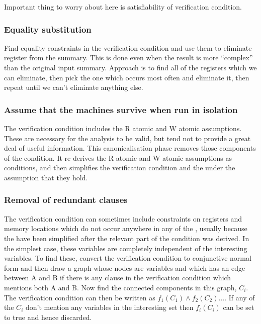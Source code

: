 \documentclass[12pt,a4paper]{book}
\begin{document}
Important thing to worry about here is satisfiability of verification condition.

\subsubsection{Equality substitution}
Find equality constraints in the verification condition and use them to eliminate register from the summary.
This is done even when the result is more ``complex'' than the original input summary.
Approach is to find all of the registers which we can eliminate, then pick the one which occurs most often and eliminate it, then repeat until we can't eliminate anything else.


\subsubsection{Assume that the machines survive when run in isolation}
The verification condition includes the R atomic and W atomic assumptions.
These are necessary for the analysis to be valid, but tend not to provide a great deal of useful information.
This canonicalisation phase removes those components of the condition.
It re-derives the R atomic and W atomic assumptions as conditions, and then simplifies the verification condition and the \StateMachines under the assumption that they hold.

\subsubsection{Removal of redundant clauses}
The verification condition can sometimes include constraints on registers and memory locations which do not occur anywhere in any of the \StateMachines, usually because the \StateMachines have been simplified after the relevant part of the condition was derived.
In the simplest case, these variables are completely independent of the interesting variables.
To find these, convert the verification condition to conjunctive normal form and then draw a graph whose nodes are variables and which has an edge between A and B if there is any clause in the verification condition which mentions both A and B.
Now find the connected components in this graph, $C_i$.
The verification condition can then be written as $f_1(C_1) \wedge f_2(C_2) \ldots$.
If any of the $C_i$ don't mention any variables in the interesting set then $f_i(C_i)$ can be set to true and hence discarded.
\end{document}
